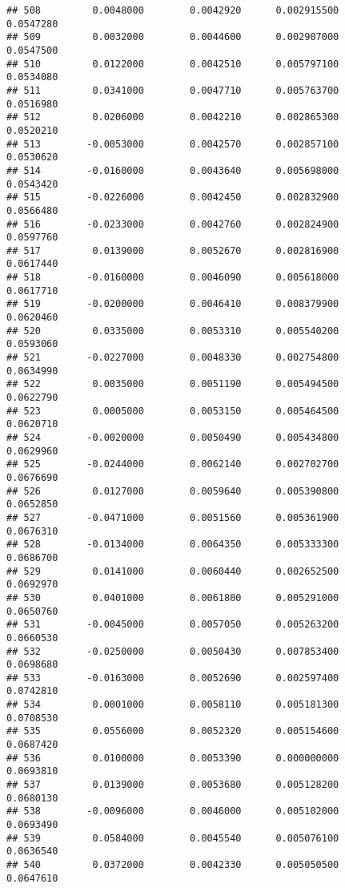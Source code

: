 \documentclass[
]{article}
\begin{document}
\begin{verbatim}
## 508         0.0048000        0.0042920      0.002915500             0.0547280
## 509         0.0032000        0.0044600      0.002907000             0.0547500
## 510         0.0122000        0.0042510      0.005797100             0.0534080
## 511         0.0341000        0.0047710      0.005763700             0.0516980
## 512         0.0206000        0.0042210      0.002865300             0.0520210
## 513        -0.0053000        0.0042570      0.002857100             0.0530620
## 514        -0.0160000        0.0043640      0.005698000             0.0543420
## 515        -0.0226000        0.0042450      0.002832900             0.0566480
## 516        -0.0233000        0.0042760      0.002824900             0.0597760
## 517         0.0139000        0.0052670      0.002816900             0.0617440
## 518        -0.0160000        0.0046090      0.005618000             0.0617710
## 519        -0.0200000        0.0046410      0.008379900             0.0620460
## 520         0.0335000        0.0053310      0.005540200             0.0593060
## 521        -0.0227000        0.0048330      0.002754800             0.0634990
## 522         0.0035000        0.0051190      0.005494500             0.0622790
## 523         0.0005000        0.0053150      0.005464500             0.0620710
## 524        -0.0020000        0.0050490      0.005434800             0.0629960
## 525        -0.0244000        0.0062140      0.002702700             0.0676690
## 526         0.0127000        0.0059640      0.005390800             0.0652850
## 527        -0.0471000        0.0051560      0.005361900             0.0676310
## 528        -0.0134000        0.0064350      0.005333300             0.0686700
## 529         0.0141000        0.0060440      0.002652500             0.0692970
## 530         0.0401000        0.0061800      0.005291000             0.0650760
## 531        -0.0045000        0.0057050      0.005263200             0.0660530
## 532        -0.0250000        0.0050430      0.007853400             0.0698680
## 533        -0.0163000        0.0052690      0.002597400             0.0742810
## 534         0.0001000        0.0058110      0.005181300             0.0708530
## 535         0.0556000        0.0052320      0.005154600             0.0687420
## 536         0.0100000        0.0053390      0.000000000             0.0693810
## 537         0.0139000        0.0053680      0.005128200             0.0680130
## 538        -0.0096000        0.0046000      0.005102000             0.0693490
## 539         0.0584000        0.0045540      0.005076100             0.0636540
## 540         0.0372000        0.0042330      0.005050500             0.0647610

\end{verbatim}
\end{document}
